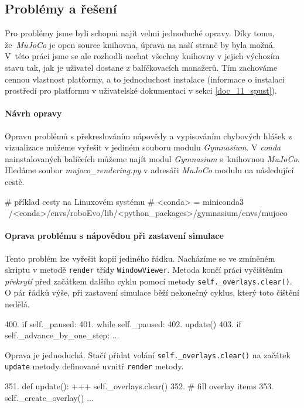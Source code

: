 \subsection{Problémy a řešení}
Pro problémy jsme byli schopni najít velmi jednoduché opravy. Díky tomu,
že~\emph{MuJoCo} je open source knihovna, úprava na naší straně by byla možná.
V~této práci jsme se ale rozhodli nechat všechny knihovny v jejich výchozím
stavu tak, jak je uživatel dostane z balíčkovacích manažerů. Tím zachováme
cennou vlastnost platformy, a to jednoduchost instalace (informace o instalaci
prostředí pro platformu v uživatelské dokumentaci v sekci \ref{doc_11_spust}).

\paragraph{Návrh opravy}
Opravu problémů s překreslováním nápovědy a vypisováním chybových hlášek z
vizualizace můžeme vyřešit v jediném souboru modulu \emph{Gymnasium}. V
\emph{conda} nainstalovaných balíčcích můžeme najít modul \emph{Gymnasium}
s~knihovnou \emph{MuJoCo}. Hledáme soubor \emph{mujoco\_rendering.py} v
adresáři \emph{MuJoCo} modulu na následující cestě. 
\begin{code}
# příklad cesty na Linuxovém systému
# <conda> = miniconda3
~/<conda>/envs/roboEvo/lib/<python_packages>/gymnasium/envs/mujoco
\end{code}

\paragraph{Oprava problému s nápovědou při zastavení simulace}
Tento problém lze vyřešit kopií jediného řádku. Nacházíme se ve
zmíněném skriptu v metodě \texttt{render} třídy \texttt{WindowViewer}. Metoda
končí práci vyčištěním \emph{překrytí} před začátkem dalšího cyklu pomocí
metody \texttt{self.\_overlays.clear()}. O pár řádků výše, při zastavení
simulace běží nekonečný cyklus, který toto čištění nedělá. 
\begin{code}
400.  if self._paused:                       
401.      while self._paused:                
402.          update()                      
403.          if self._advance_by_one_step:
...
\end{code}
Oprava je jednoduchá. Stačí přidat volání \texttt{self.\_overlays.clear()} na
začátek \texttt{update} metody definované uvnitř \texttt{render} metody.
\begin{code}
351.  def update():
+++       self._overlays.clear()
352.      # fill overlay items
353.      self._create_overlay()
...
\end{code}

